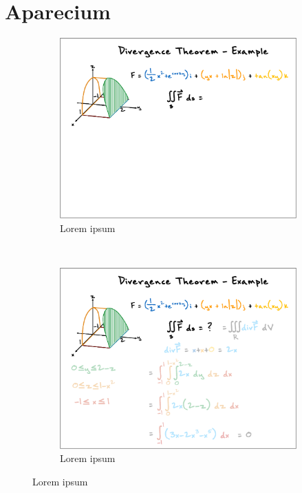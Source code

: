 \section{Aparecium}
\begin{figure}[ht!]
    \centering
    \begin{subfigure}[t]{0.32\textwidth}
        \centering
        \includegraphics[width=1\columnwidth]{figures/videoslide1}
        \caption{Lorem ipsum}
    \end{subfigure}%
    ~ 
    \begin{subfigure}[t]{0.32\textwidth}
        \centering
        \includegraphics[width=1\columnwidth]{figures/videoslide2}
        \caption{Lorem ipsum}

\end{subfigure}
\end{figure}
